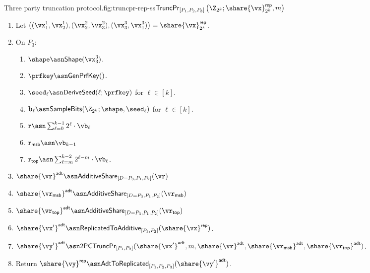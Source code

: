 \begin{Boxfig}{Three party truncation protocol.}{fig:truncpr-rep-ss}{$\mathsf{TruncPr}_{[P_1, P_2, P_3]} \left(\Z_{2^k}; \share{\vx}^{\mathsf{rep}}_{2^k}, m \right)$}
\begin{enumerate}
  \item Let $\left( (\vx_1^1, \vx_2^1), (\vx_2^2, \vx_3^2), (\vx_3^3, \vx_1^3) \right) = \share{\vx}^{\mathsf{rep}}_{2^k}$.

  \item On $P_3$:
  \begin{enumerate}
    \item $\shape \asn \mathsf{Shape}(\vx^3_3)$.
    \item $\prfkey \asn \mathsf{GenPrfKey}()$.
    \item $\seed_\ell \asn \mathsf{DeriveSeed}(\ell; \prfkey)$ for $\ell \in [k]$.
    \item $\mathbf{b}_\ell \asn \mathsf{SampleBits}(\Z_{2^k}; \shape, \seed_\ell)$ for $\ell \in [k]$.
    \item $\mathbf{r} \asn \sum_{\ell=0}^{k-1}2^\ell \cdot \vb_\ell$
    \item $\mathbf{r}_{\mathsf{msb}} \asn \vb_{k-1}$
    \item $\mathbf{r}_{\mathsf{top}} \asn \sum_{\ell=m}^{k-2} 2^{\ell-m} \cdot \vb_\ell$.
  \end{enumerate}

  \item $\share{\vr}^{\mathsf{adt}} \asn \mathsf{AdditiveShare}_{[D=P_3, P_1, P_2]}(\vr)$

  \item $\share{\vr_{\mathsf{msb}}}^{\mathsf{adt}} \asn \mathsf{AdditiveShare}_{[D=P_3, P_1, P_2]}(\vr_{\mathsf{msb}})$

  \item $\share{\vr_{\mathsf{top}}}^{\mathsf{adt}} \asn \mathsf{AdditiveShare}_{[D=P_3, P_1, P_2]}(\vr_{\mathsf{top}})$

  \item $\share{\vx'}^{\mathsf{adt}} \asn \mathsf{ReplicatedToAdditive}_{[P_1, P_2]}(\share{\vx}^{\mathsf{rep}})$.

  \item $\share{\vy'}^{\mathsf{adt}} \asn \mathsf{2PCTruncPr}_{[P_1, P_2]}(\share{\vx'}^{\mathsf{adt}}, m, \share{\vr}^{\mathsf{adt}}, \share{\vr_{\mathsf{msb}}}^{\mathsf{adt}}, \share{\vr_{\mathsf{top}}}^{\mathsf{adt}} )$.

  \item Return $\share{\vy}^{\mathsf{rep}} \asn \mathsf{AdtToReplicated}_{[P_1, P_2, P_3]}(\share{\vy'}^{\mathsf{adt}})$.


\end{enumerate}
\end{Boxfig}
